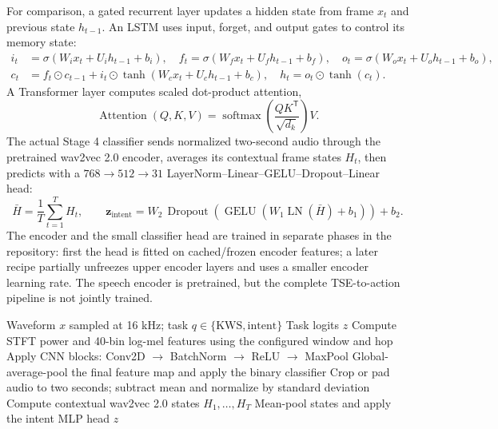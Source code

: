 For comparison, a gated recurrent layer updates a hidden state from frame $x_t$ and previous state $h_{t-1}$. An LSTM uses input, forget, and output gates to control its memory state:
\begin{align}
  i_t&=\sigma(W_i x_t+U_i h_{t-1}+b_i),\quad
  f_t=\sigma(W_f x_t+U_f h_{t-1}+b_f),\quad
  o_t=\sigma(W_o x_t+U_o h_{t-1}+b_o),\\
  c_t&=f_t\odot c_{t-1}+i_t\odot\tanh(W_c x_t+U_c h_{t-1}+b_c),\quad
  h_t=o_t\odot\tanh(c_t).
  \label{eq:lstm-state}
\end{align}
A Transformer layer computes scaled dot-product attention,
\begin{equation}
  \operatorname{Attention}(Q,K,V)=\operatorname{softmax}\!\left(\frac{QK^{\mathsf T}}{\sqrt{d_k}}\right)V.
  \label{eq:attention}
\end{equation}
The actual Stage 4 classifier sends normalized two-second audio through the pretrained wav2vec 2.0 encoder, averages its contextual frame states $H_t$, then predicts with a $768\!\rightarrow\!512\!\rightarrow\!31$ LayerNorm--Linear--GELU--Dropout--Linear head:
\begin{equation}
  \bar{H}=\frac{1}{T}\sum_{t=1}^{T}H_t,\qquad
  \mathbf{z}_{\mathrm{intent}}=W_2\,\operatorname{Dropout}\!\left(\operatorname{GELU}(W_1\operatorname{LN}(\bar H)+b_1)\right)+b_2.
  \label{eq:wav2vec-head}
\end{equation}
The encoder and the small classifier head are trained in separate phases in the repository: first the head is fitted on cached/frozen encoder features; a later recipe partially unfreezes upper encoder layers and uses a smaller encoder learning rate. The speech encoder is pretrained, but the complete TSE-to-action pipeline is not jointly trained.

\begin{algorithm}[H]
  \caption{Feature and classifier paths used by KWS and intent models}
  \label{alg:features}
  \begin{algorithmic}[1]
    \Require Waveform $x$ sampled at 16 kHz; task $q\in\{\mathrm{KWS},\mathrm{intent}\}$
    \Ensure Task logits $z$
      \State Compute STFT power and 40-bin log-mel features using the configured window and hop
      \State Apply CNN blocks: Conv2D $\rightarrow$ BatchNorm $\rightarrow$ ReLU $\rightarrow$ MaxPool
      \State Global-average-pool the final feature map and apply the binary classifier
    \Else
      \State Crop or pad audio to two seconds; subtract mean and normalize by standard deviation
      \State Compute contextual wav2vec 2.0 states $H_1,\ldots,H_T$
      \State Mean-pool states and apply the intent MLP head
    \EndIf
    \State \Return $z$
  \end{algorithmic}
\end{algorithm}

